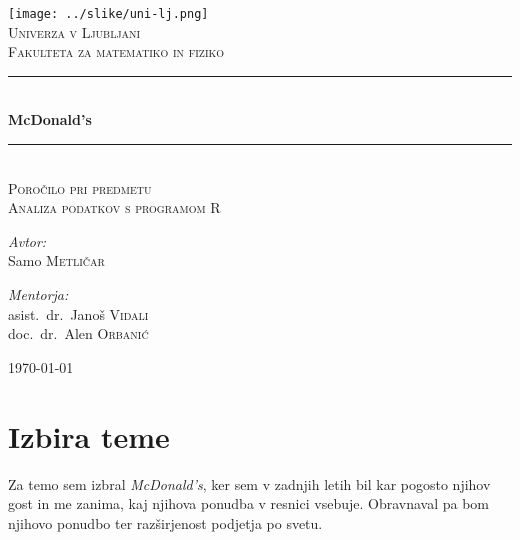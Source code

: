 \documentclass[hidelinks, 11pt,a4paper]{article}
\begin{document}
\newcommand{\HRule}{\rule{\linewidth}{0.5mm}}

\begin{titlepage}
\begin{center}
\texttt{[image: ../slike/uni-lj.png]}~\\
\textsc{Univerza v Ljubljani}\\
\textsc{\large Fakulteta za matematiko in fiziko}\\[2cm]

\HRule \\[0.3cm]
{\huge \bfseries McDonald's} \\
\HRule \\[0.5cm]

\textsc{\Large Poročilo pri predmetu \\ \LARGE Analiza podatkov s programom R} \\[4cm]

\noindent
\begin{minipage}{0.4\textwidth}
\begin{flushleft} \large
\emph{Avtor:}\\
Samo \textsc{Metličar}
\end{flushleft}
\end{minipage}%
\begin{minipage}{0.4\textwidth}
\begin{flushright} \large
\emph{Mentorja:} \\
asist.~dr.~Janoš \textsc{Vidali} \\
doc.~dr.~Alen \textsc{Orbanić}
\end{flushright}
\end{minipage}

\vfill

{\large \today}


\end{center}
\end{titlepage}

\tableofcontents


\newpage
\section{Izbira teme}

Za temo sem izbral \textit{McDonald's}, ker sem v zadnjih letih bil kar pogosto njihov gost in me zanima, kaj njihova ponudba v resnici vsebuje. Obravnaval pa bom njihovo ponudbo ter raz\-šir\-je\-nost podjetja po svetu.
\end{document}
